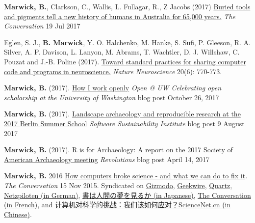 \documentclass[11pt,article,oneside]{memoir}
\begin{document}
{{{\ind \textbf{Marwick, B.}, Clarkson, C., Wallis, L. Fullagar, R., Z Jacobs (2017) \href{https://theconversation.com/buried-tools-and-pigments-tell-a-new-history-of-humans-in-australia-for-65-000-years-81021}{Buried tools and pigments tell a new history of humans in Australia for 65,000 years.} \textit{The Conversation} 19 Jul 2017 

\ind Eglen, S. J., \textbf{B. Marwick}, Y. O. Halchenko, M. Hanke, S. Sufi, P. Gleeson, R. A. Silver, A. P. Davison, L. Lanyon, M. Abrams, T. Wachtler, D. J. Willshaw, C. Pouzat and J.-B. Poline (2017). \href{http://www.nature.com/neuro/journal/v20/n6/full/nn.4550.html}{Toward standard practices for sharing computer code and programs in neuroscience.} \textit{Nature Neuroscience} 20(6): 770-773.

\ind \textbf{Marwick, B.} (2017). \href{https://blogs.uw.edu/openpub/2017/10/26/how-i-work-open-ben-marwick/}{How I work openly} \textit{Open @ UW Celebrating open scholarship at the University of Washington} blog post October 26, 2017 

\ind \textbf{Marwick, B.} (2017). \href{https://www.software.ac.uk/blog/2017-08-09-landscape-archaeology-and-reproducible-research-2017-berlin-summer-school}{Landscape archaeology and reproducible research at the 2017 Berlin Summer School} \textit{Software Sustainability Institute} blog post 9 August 2017 

\ind \textbf{Marwick, B.} (2017). \href{http://blog.revolutionanalytics.com/2017/04/r-is-for-archaeology.html}{R is for Archaeology: A report on the 2017 Society of American Archaeology meeting} \textit{Revolutions} blog post April 14, 2017 

\ind \textbf{Marwick, B.} 2016 \href{https://theconversation.com/how-computers-broke-science-and-what-we-can-do-to-fix-it-49938}{How computers broke science - and what we can do to fix it}. \textit{The Conversation} 15 Nov 2015.  Syndicated on \href{http://gizmodo.com/how-computers-broke-science-and-what-we-can-do-to-fix-i-1741649207}{Gizmodo}, \href{http://www.geekwire.com/2015/how-computers-broke-science-and-what-we-can-do-to-fix-it/}{Geekwire}, \href{http://qz.com/548730/computers-are-making-science-extremely-challenging-for-scientists/}{Quartz}, \href{http://www.netzpiloten.de/wissenschaft-computer-reproduzierbarkeit-probleme/}{Netzpiloten (in German)}, \href{http://filled-with-deities.hatenablog.jp/entry/2015/11/17/202013}{書は人間の夢を見るか (in Japanese)}, \href{https://theconversation.com/les-ordinateurs-nuisent-gravement-a-la-science-mais-il-est-possible-dy-remedier-1-52024}{The Conversation (in French)}, and \href{http://news.sciencenet.cn/htmlnews/2017/8/385497.shtm}{计算机对科学的挑战：我们该如何应对？ScienceNet.cn (in Chinese)}.

}}}
\end{document}
